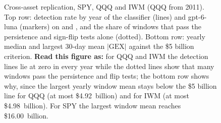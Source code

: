 \begin{figure}[H]
\centering
\resultfigure{\figCross}
\caption{Cross-asset replication, SPY, QQQ and IWM (QQQ from 2011). Top row: detection rate by year of the classifier (lines) and gpt-6-luna (markers) on  and , and the share of windows that pass the persistence and sign-flip tests alone (dotted). Bottom row: yearly median and largest 30-day mean $|\mathrm{GEX}|$ against the \$5 billion criterion. \textbf{Read this figure as:} for QQQ and IWM the detection lines lie at zero in every year while the dotted lines show that many windows pass the persistence and flip tests; the bottom row shows why, since the largest yearly window mean stays below the \$5 billion line for QQQ (at most \$4.92~billion) and for IWM (at most \$4.98~billion). For SPY the largest window mean reaches \$16.00~billion.}
\label{fig:cross}
\end{figure}
